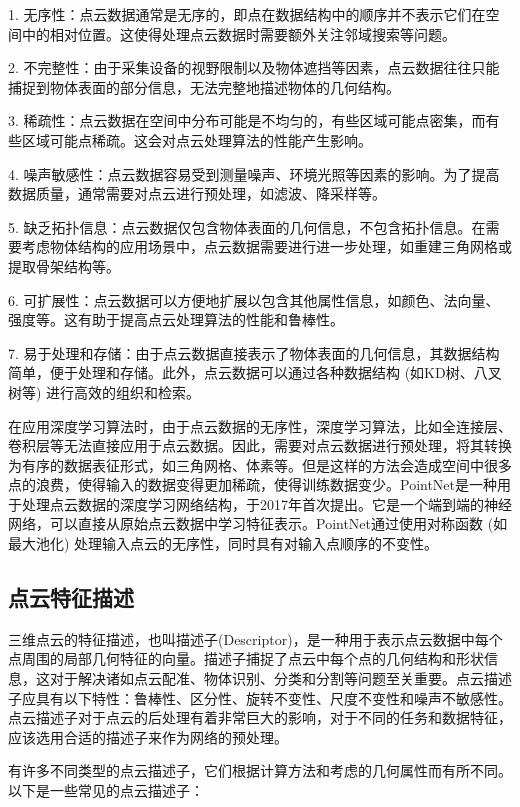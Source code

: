 1. 无序性：点云数据通常是无序的，即点在数据结构中的顺序并不表示它们在空间中的相对位置。这使得处理点云数据时需要额外关注邻域搜索等问题。

2. 不完整性：由于采集设备的视野限制以及物体遮挡等因素，点云数据往往只能捕捉到物体表面的部分信息，无法完整地描述物体的几何结构。

3. 稀疏性：点云数据在空间中分布可能是不均匀的，有些区域可能点密集，而有些区域可能点稀疏。这会对点云处理算法的性能产生影响。

4. 噪声敏感性：点云数据容易受到测量噪声、环境光照等因素的影响。为了提高数据质量，通常需要对点云进行预处理，如滤波、降采样等。

5. 缺乏拓扑信息：点云数据仅包含物体表面的几何信息，不包含拓扑信息。在需要考虑物体结构的应用场景中，点云数据需要进行进一步处理，如重建三角网格或提取骨架结构等。

6. 可扩展性：点云数据可以方便地扩展以包含其他属性信息，如颜色、法向量、强度等。这有助于提高点云处理算法的性能和鲁棒性。

7. 易于处理和存储：由于点云数据直接表示了物体表面的几何信息，其数据结构简单，便于处理和存储。此外，点云数据可以通过各种数据结构 (如KD树、八叉树等) 进行高效的组织和检索。

在应用深度学习算法时，由于点云数据的无序性，深度学习算法，比如全连接层、卷积层等无法直接应用于点云数据。因此，需要对点云数据进行预处理，将其转换为有序的数据表征形式，如三角网格\cite{jiang2020local}、体素\cite{guan2020voxel}等。但是这样的方法会造成空间中很多点的浪费，使得输入的数据变得更加稀疏，使得训练数据变少。PointNet\cite{qi2017pointnet}是一种用于处理点云数据的深度学习网络结构，于2017年首次提出。它是一个端到端的神经网络，可以直接从原始点云数据中学习特征表示。PointNet通过使用对称函数 (如最大池化) 处理输入点云的无序性，同时具有对输入点顺序的不变性。


\subsection{点云特征描述}
三维点云的特征描述，也叫描述子(Descriptor)，是一种用于表示点云数据中每个点周围的局部几何特征的向量。描述子捕捉了点云中每个点的几何结构和形状信息，这对于解决诸如点云配准、物体识别、分类和分割等问题至关重要。点云描述子应具有以下特性：鲁棒性、区分性、旋转不变性、尺度不变性和噪声不敏感性。点云描述子对于点云的后处理有着非常巨大的影响，对于不同的任务和数据特征，应该选用合适的描述子来作为网络的预处理。

有许多不同类型的点云描述子，它们根据计算方法和考虑的几何属性而有所不同。以下是一些常见的点云描述子：

